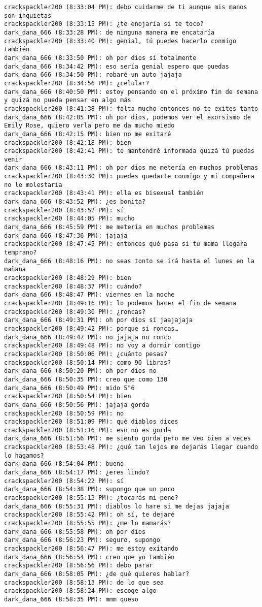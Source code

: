 \begin{verbatim}
crackspackler200 (8:33:04 PM): debo cuidarme de ti aunque mis manos son inquietas
crackspackler200 (8:33:15 PM): ¿te enojaría si te toco?
dark_dana_666 (8:33:28 PM): de ninguna manera me encataría
crackspackler200 (8:33:40 PM): genial, tú puedes hacerlo conmigo también
dark_dana_666 (8:33:50 PM): oh por dios sí totalmente
dark_dana_666 (8:34:42 PM): eso sería genial espero que puedas
dark_dana_666 (8:34:50 PM): robaré un auto jajaja
crackspackler200 (8:34:56 PM): ¿celular?
dark_dana_666 (8:40:50 PM): estoy pensando en el próximo fin de semana y quizá no pueda pensar en algo más
crackspackler200 (8:41:38 PM): falta mucho entonces no te exites tanto
dark_dana_666 (8:42:05 PM): oh por dios, podemos ver el exorsismo de Emily Rose, quiero verla pero me da mucho miedo
dark_dana_666 (8:42:15 PM): bien no me exitaré
crackspackler200 (8:42:18 PM): bien
crackspackler200 (8:42:41 PM): te mantendré informada quizá tú puedas venir
dark_dana_666 (8:43:11 PM): oh por dios me metería en muchos problemas
crackspackler200 (8:43:30 PM): puedes quedarte conmigo y mi compañera no le molestaría
crackspackler200 (8:43:41 PM): ella es bisexual también
dark_dana_666 (8:43:52 PM): ¿es bonita?
crackspackler200 (8:43:52 PM): sí
crackspackler200 (8:44:05 PM): mucho
dark_dana_666 (8:45:59 PM): me metería en muchos problemas
dark_dana_666 (8:47:36 PM): jajaja
crackspackler200 (8:47:45 PM): entonces qué pasa si tu mama llegara temprano?
dark_dana_666 (8:48:16 PM): no seas tonto se irá hasta el lunes en la mañana 
crackspackler200 (8:48:29 PM): bien
crackspackler200 (8:48:37 PM): cuándo? 
dark_dana_666 (8:48:47 PM): viernes en la noche
crackspackler200 (8:49:16 PM): lo podemos hacer el fin de semana
crackspackler200 (8:49:30 PM): ¿roncas?
dark_dana_666 (8:49:31 PM): oh por dios sí jaajajaja 
crackspackler200 (8:49:42 PM): porque si roncas…
dark_dana_666 (8:49:47 PM): no jajaja no ronco
crackspackler200 (8:49:48 PM): no voy a dormir contigo 
crackspackler200 (8:50:06 PM): ¿cuánto pesas?
crackspackler200 (8:50:14 PM): como 90 libras?
dark_dana_666 (8:50:20 PM): oh por dios no
dark_dana_666 (8:50:35 PM): creo que como 130
dark_dana_666 (8:50:49 PM): mido 5"6
crackspackler200 (8:50:54 PM): bien
dark_dana_666 (8:50:56 PM): jajaja gorda
crackspackler200 (8:50:59 PM): no
crackspackler200 (8:51:09 PM): qué diablos dices
crackspackler200 (8:51:16 PM): eso no es gorda
dark_dana_666 (8:51:56 PM): me siento gorda pero me veo bien a veces
crackspackler200 (8:53:48 PM): ¿qué tan lejos me dejarás llegar cuando lo hagamos?
dark_dana_666 (8:54:04 PM): bueno
dark_dana_666 (8:54:17 PM): ¿eres lindo?
crackspackler200 (8:54:22 PM): sí
dark_dana_666 (8:54:38 PM): supongo que un poco
crackspackler200 (8:55:13 PM): ¿tocarás mi pene?
dark_dana_666 (8:55:31 PM): diablos lo hare si me dejas jajaja
crackspackler200 (8:55:42 PM): oh sí, te dejaré
crackspackler200 (8:55:55 PM): ¿me lo mamarás?
dark_dana_666 (8:55:58 PM): oh por dios
dark_dana_666 (8:56:23 PM): seguro, supongo
crackspackler200 (8:56:47 PM): me estoy exitando
dark_dana_666 (8:56:54 PM): creo que yo también
crackspackler200 (8:56:56 PM): debo parar
dark_dana_666 (8:58:05 PM): ¿de qué quieres hablar?
crackspackler200 (8:58:13 PM): de lo que sea
crackspackler200 (8:58:24 PM): escoge algo
dark_dana_666 (8:58:35 PM): mmm queso
\end{verbatim}
